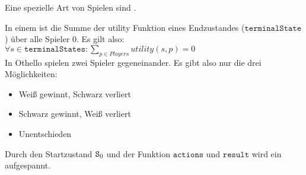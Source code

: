Eine spezielle Art von Spielen sind .
\begin{Definition}
In einem  ist die Summe der utility Funktion eines Endzustandes ($\mathtt{terminalState}$) über alle Spieler 0. Es gilt also:
\\$\forall s \in \mathtt{terminalStates}: \sum\limits_{p \in Players} utility(s, p) = 0$
\\In Othello spielen zwei Spieler gegeneinander. Es gibt also nur die drei Möglichkeiten:
\begin{itemize}
\item Weiß gewinnt, Schwarz verliert
\item Schwarz gewinnt, Weiß verliert
\item Unentschieden
\end{itemize}
\end{Definition}
Durch den Startzustand $\mathtt{S\textsubscript{0}}$ und der Funktion $\mathtt{actions}$ und $\mathtt{result}$ wird ein  aufgespannt.
